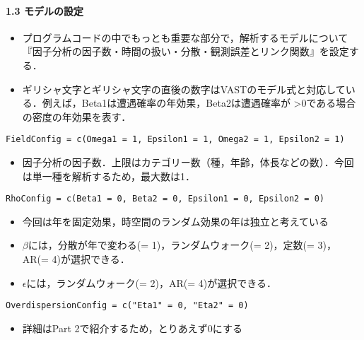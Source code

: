 \documentclass[]{article}
\providecommand{\tightlist}{%
  \setlength{\itemsep}{0pt}\setlength{\parskip}{0pt}}
\let\oldparagraph\paragraph
\renewcommand{\paragraph}[1]{\oldparagraph{#1}\mbox{}}
\begin{document}
\hypertarget{ux30e2ux30c7ux30ebux306eux8a2dux5b9a}{%
\paragraph{1.3
モデルの設定}\label{ux30e2ux30c7ux30ebux306eux8a2dux5b9a}}

\begin{itemize}
\tightlist
\item
  プログラムコードの中でもっとも重要な部分で，解析するモデルについて『因子分析の因子数・時間の扱い・分散・観測誤差とリンク関数』を設定する．\\
\item
  ギリシャ文字とギリシャ文字の直後の数字はVASTのモデル式と対応している．例えば，Beta1は遭遇確率の年効果，Beta2は遭遇確率が
  \textgreater{}0である場合の密度の年効果を表す．
\end{itemize}

\begin{verbatim}
FieldConfig = c(Omega1 = 1, Epsilon1 = 1, Omega2 = 1, Epsilon2 = 1)
\end{verbatim}

\begin{itemize}
\tightlist
\item
  因子分析の因子数．上限はカテゴリー数（種，年齢，体長などの数）．今回は単一種を解析するため，最大数は1．
\end{itemize}

\begin{verbatim}
RhoConfig = c(Beta1 = 0, Beta2 = 0, Epsilon1 = 0, Epsilon2 = 0)
\end{verbatim}

\begin{itemize}
\tightlist
\item
  今回は年を固定効果，時空間のランダム効果の年は独立と考えている
\item
  \(\beta\)には，分散が年で変わる(= 1)，ランダムウォーク(= 2)，定数(=
  3)，AR(= 4)が選択できる．
\item
  \(\epsilon\)には，ランダムウォーク(= 2)，AR(= 4)が選択できる．
\end{itemize}

\begin{verbatim}
OverdispersionConfig = c("Eta1" = 0, "Eta2" = 0)
\end{verbatim}

\begin{itemize}
\tightlist
\item
  詳細はPart 2で紹介するため，とりあえず0にする
\end{itemize}
\end{document}
